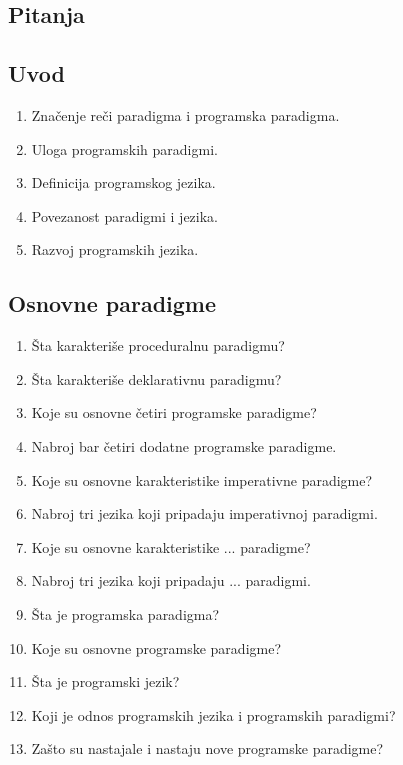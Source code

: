 \documentclass[main.tex]{subfiles}
\begin{document}
\newpage
\begin{boxnaslovi}
\section{Pitanja}
\end{boxnaslovi}

\begin{multicols}{2}

\subsection{Uvod}
\begin{enumerate}

\item Značenje reči paradigma i programska paradigma.
\item Uloga programskih paradigmi.
\item Definicija programskog jezika.
\item Povezanost paradigmi i jezika.
\item Razvoj programskih jezika.

\end{enumerate}

\subsection{Osnovne paradigme}
\begin{enumerate}
\item Šta karakteriše proceduralnu paradigmu?
\item Šta karakteriše deklarativnu paradigmu?
\item Koje su osnovne četiri programske paradigme?
\item Nabroj bar četiri dodatne programske paradigme.
\item Koje su osnovne karakteristike imperativne paradigme?
\item Nabroj tri jezika koji pripadaju imperativnoj paradigmi.
\item Koje su osnovne karakteristike ... paradigme?
\item Nabroj tri jezika koji pripadaju ... paradigmi.
\item Šta je programska paradigma?
\item Koje su osnovne programske paradigme?
\item Šta je programski jezik?
\item Koji je odnos programskih jezika i programskih paradigmi?
\item Zašto su nastajale i nastaju nove programske paradigme?


\end{enumerate}
\end{multicols}
\end{document}
